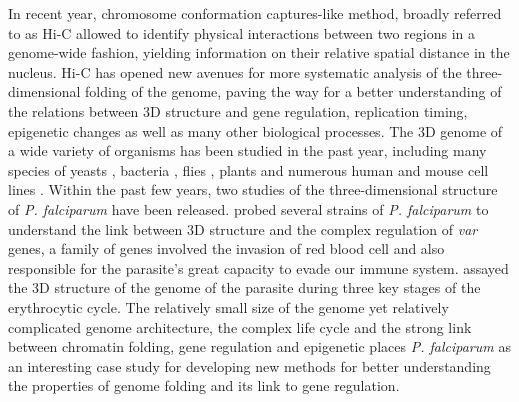 \documentclass[2columns]{article}
\begin{document}
In recent year, chromosome conformation captures-like method, broadly referred
to as Hi-C allowed to identify physical interactions between two regions in a
genome-wide fashion, yielding information on their relative spatial distance
in the nucleus. Hi-C has opened new avenues for more systematic analysis of
the three-dimensional folding of the genome, paving the way for a better
understanding of the relations between 3D structure and gene regulation,
replication timing, epigenetic changes as well as many other biological
processes. The 3D genome of a wide variety of organisms has been studied in
the past year, including many species of yeasts \citep{duan:three-dimensional,
burton:species-level, mizuguchi:cohesin-dependent}, bacteria
\citep{umbarger:three-dimensional}, flies \citep{sexton:three-dimensional},
plants \citep{feng:genome-wide, wang:genome-wide} and numerous human and mouse
cell lines \citep{lieberman-aiden:comprehensive, rao:3D}. Within the past few
years, two studies of the three-dimensional structure of {\em P. falciparum}
have been released.  \citet{lemieux:genome-wide} probed several strains of
{\em P. falciparum} to understand the link between 3D structure and the
complex regulation of \textit{var} genes, a family of genes involved the
invasion of red blood cell and also responsible for the parasite's great
capacity to evade our immune system. \citet{ay:three-dimensional} assayed the
3D structure of the genome of the parasite during three key stages of the
erythrocytic cycle. The relatively small size of the genome yet relatively
complicated genome architecture, the complex life cycle and the strong link
between chromatin folding, gene regulation and epigenetic places {\em P.
falciparum} as an interesting case study for developing new methods for better
understanding the properties of genome folding and its link to gene
regulation.
\end{document}
